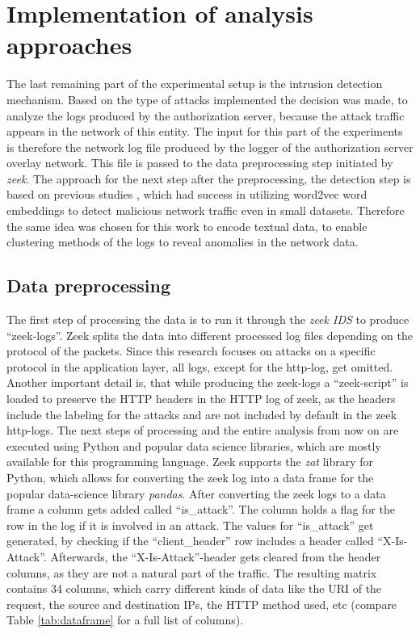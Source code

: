 \documentclass[
    fontsize=12pt,
    headings=small,
    parskip=half,           %
    bibliography=totoc,
    numbers=noenddot,       %
    open=any,               %
    ]{scrreprt}
\begin{document}
\section{Implementation of analysis approaches}
The last remaining part of the experimental setup is the intrusion detection mechanism. Based on the type of attacks implemented the decision was made, to analyze the logs produced by the authorization server, because the attack traffic appears in the network of this entity. The input for this part of the experiments is therefore the network log file produced by the logger of the authorization server overlay network. This file is passed to the data preprocessing step initiated by \emph{zeek}. The approach for the next step after the preprocessing, the detection step is based on previous studies \cite{carrasco2018unsupervised} \cite{zhuo2017network}, which had success in utilizing word2vec word embeddings to detect malicious network traffic even in small datasets. Therefore the same idea was chosen for this work to encode textual data, to enable clustering methods of the logs to reveal anomalies in the network data.

\subsection{Data preprocessing}
\label{subsec:dataset}
The first step of processing the data is to run it through the \emph{zeek IDS} to produce ``zeek-logs''. Zeek splits the data into different processed log files depending on the protocol of the packets. Since this research focuses on attacks on a specific protocol in the application layer, all logs, except for the http-log, get omitted. Another important detail is, that while producing the zeek-logs a ``zeek-script'' is loaded to preserve the HTTP headers in the HTTP log of zeek, as the headers include the labeling for the attacks and are not included by default in the zeek http-logs. The next steps of processing and the entire analysis from now on are executed using Python and popular data science libraries, which are mostly available for this programming language. Zeek supports the \emph{zat} library for Python, which allows for converting the zeek log into a data frame for the popular data-science library \emph{pandas}. After converting the zeek logs to a data frame a column gets added called ``is\_attack''. The column holds a flag for the row in the log if it is involved in an attack. The values for ``is\_attack'' get generated, by checking if the ``client\_header'' row includes a header called ``X-Is-Attack''. Afterwards, the ``X-Is-Attack''-header gets cleared from the header columns, as they are not a natural part of the traffic. The resulting matrix contains 34 columns, which carry different kinds of data like the URI of the request, the source and destination IPs, the HTTP method used, etc (compare Table \ref{tab:dataframe} for a full list of columns).
\end{document}
